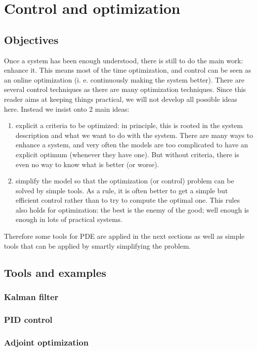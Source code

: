 \thispagestyle{empty}
\chapter{Control and optimization}
\label{control.chap}

\section{Objectives}
Once a system has been enough understood, there is still to do the main work: enhance it. This means most of the time optimization, and control can be seen as an online optimization (i. e. continuously making the system better). There are several control techniques as there are many optimization techniques. Since this reader aims at keeping things practical, we will not develop all possible ideas here. Instead we insist onto 2 main ideas:
\begin{enumerate}
	\item explicit a criteria to be optimized: in principle, this is rooted in the system description and what we want to do with the system. There are many ways to enhance a system, and very often the models are too complicated to have an explicit optimum (whenever they have one). But without criteria, there is even no way to know what is better (or worse).
	\item simplify the model so that the optimization (or control) problem can be solved by simple tools. As a rule, it is often better to get a simple but efficient control rather than to try to compute the optimal one. This rules also holds for optimization: the best is the enemy of the good; well enough is enough in lots of practical systems.
\end{enumerate}

Therefore some tools for PDE are applied in the next sections as well as simple tools that can be applied by smartly simplifying the problem.

\section{Tools and examples}

\subsection{Kalman filter}


\subsection{PID control}

\subsection{Adjoint optimization}

